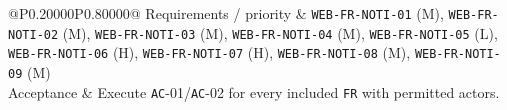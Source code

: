 \begin{longtable}{@{}P{0.20000\SRSWidth}P{0.80000\SRSWidth}@{}}
Requirements /\allowbreak{} priority & \texttt{WEB-\allowbreak{}FR-\allowbreak{}NOTI-\allowbreak{}01} (M), \texttt{WEB-\allowbreak{}FR-\allowbreak{}NOTI-\allowbreak{}02} (M), \texttt{WEB-\allowbreak{}FR-\allowbreak{}NOTI-\allowbreak{}03} (M), \texttt{WEB-\allowbreak{}FR-\allowbreak{}NOTI-\allowbreak{}04} (M), \texttt{WEB-\allowbreak{}FR-\allowbreak{}NOTI-\allowbreak{}05} (L), \texttt{WEB-\allowbreak{}FR-\allowbreak{}NOTI-\allowbreak{}06} (H), \texttt{WEB-\allowbreak{}FR-\allowbreak{}NOTI-\allowbreak{}07} (H), \texttt{WEB-\allowbreak{}FR-\allowbreak{}NOTI-\allowbreak{}08} (M), \texttt{WEB-\allowbreak{}FR-\allowbreak{}NOTI-\allowbreak{}09} (M) \\[3pt]
Acceptance & Execute \texttt{AC}-01/\allowbreak{}\texttt{AC}-02 for every included \texttt{FR} with permitted actors. \\[3pt]
\end{longtable}
\endgroup

